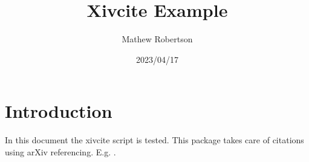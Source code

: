 \documentclass{article}
\title{Xivcite Example}
\author{Mathew Robertson}
\date{2023/04/17}
\begin{document}
\maketitle

\section{Introduction}
In this document the xivcite script is tested. This package takes care of citations using arXiv referencing. E.g.  \cite{?2303.13313} \cite{?astro-ph/0601594}.


\printbibliography
\end{document}
